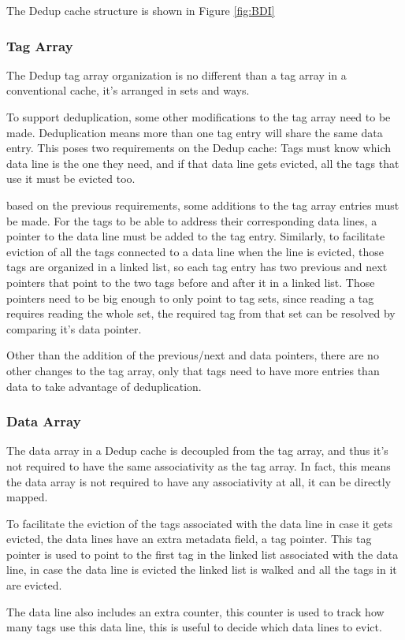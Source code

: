 The Dedup cache structure is shown in Figure \ref{fig:BDI}

\subsubsection{Tag Array}
\label{sssec:DedupTag}
The Dedup tag array organization is no different than a tag array in a conventional cache, it's arranged in sets and ways.\par
To support deduplication, some other modifications to the tag array need to be made. Deduplication means more than one tag entry will share the same data entry. This poses two requirements on the Dedup cache: Tags must know which data line is the one they need, and if that data line gets evicted, all the tags that use it must be evicted too.\par
based on the previous requirements, some additions to the tag array entries must be made. For the tags to be able to address their corresponding data lines, a pointer to the data line must be added to the tag entry. Similarly, to facilitate eviction of all the tags connected to a data line when the line is evicted, those tags are organized in a linked list, so each tag entry has two previous and next pointers that point to the two tags before and after it in a linked list. Those pointers need to be big enough to only point to tag sets, since reading a tag requires reading the whole set, the required tag from that set can be resolved by comparing it's data pointer.\par
Other than the addition of the previous/next and data pointers, there are no other changes to the tag array, only that tags need to have more entries than data to take advantage of deduplication.
\subsubsection{Data Array}
\label{sssec:DedupData}
The data array in a Dedup cache is decoupled from the tag array, and thus it's not required to have the same associativity as the tag array. In fact, this means the data array is not required to have any associativity at all, it can be directly mapped.\par
To facilitate the eviction of the tags associated with the data line in case it gets evicted, the data lines have an extra metadata field, a tag pointer. This tag pointer is used to point to the first tag in the linked list associated with the data line, in case the data line is evicted the linked list is walked and all the tags in it are evicted.\par
The data line also includes an extra counter, this counter is used to track how many tags use this data line, this is useful to decide which data lines to evict.
